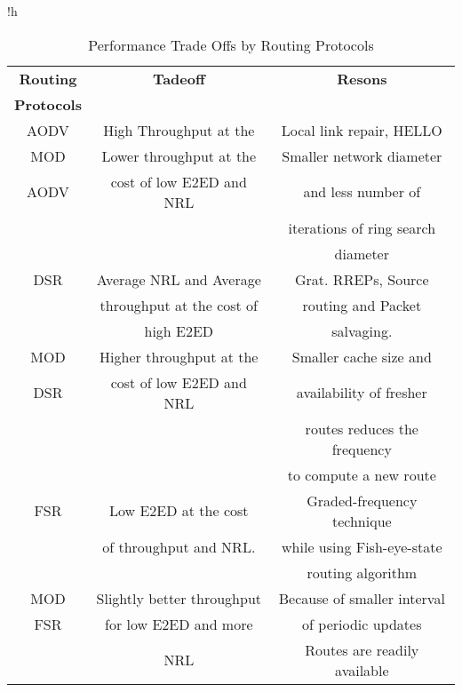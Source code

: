\documentclass[journal]{IEEEtran}
\begin{document}
\small
\vspace{0.09cm}
\begin{table}{!h}
\caption {Performance Trade Offs by Routing Protocols}
\begin {center}
\begin{tabular}{|c|c|c|}


\hline
\textbf{Routing } & \textbf{Tadeoff} & \textbf{Resons} \\
\textbf{Protocols}&&\\
\hline

AODV 	&High Throughput at the & Local link repair, HELLO \\




 MOD 	  &Lower throughput at the &	  Smaller network diameter\\
AODV&cost of low E2ED and NRL&and less number of  \\
&&iterations of ring search \\
&&diameter\\
\hline



DSR 	&Average NRL and Average& Grat. RREPs, Source\\
&throughput at the cost of& routing and Packet \\
& high E2ED	&salvaging.\\
\hline

MOD& Higher throughput at the	& Smaller cache size and\\
 DSR&	 cost of low E2ED and NRL& availability of fresher \\
&&routes reduces the frequency\\
&& to compute a new route\\
\hline



FSR 	&Low E2ED at the cost &Graded-frequency technique\\
&of throughput and NRL.	& while using Fish-eye-state \\
&&routing algorithm\\
\hline
MOD &  Slightly better throughput &	Because of smaller interval \\
 FSR	&for low E2ED and more &of periodic updates \\
 &NRL &Routes are readily available\\
\hline

\end{tabular}
\end {center}
\end {table}
\end{document}
